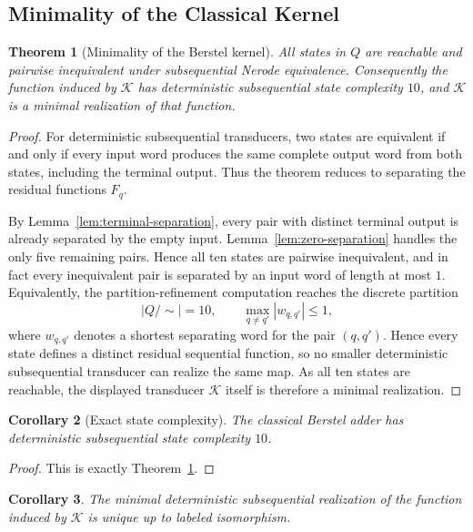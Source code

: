\documentclass[11pt,letterpaper]{article}
\numberwithin{equation}{section}
\theoremstyle{plain}
\newtheorem{theorem}{Theorem}[section]
\newtheorem{corollary}[theorem]{Corollary}
\theoremstyle{definition}
\theoremstyle{remark}
\begin{document}
\subsection{Minimality of the Classical Kernel}

\begin{theorem}[Minimality of the Berstel kernel]\label{thm:berstel-kernel-minimality}
All states in $Q$ are reachable and pairwise inequivalent under subsequential
Nerode equivalence.  Consequently the function induced by $\mathcal K$ has
deterministic subsequential state complexity $10$, and $\mathcal K$ is a
minimal realization of that function.
\end{theorem}

\begin{proof}
For deterministic subsequential transducers, two states are equivalent if and
only if every input word produces the same complete output word from both
states, including the terminal output.  Thus the theorem reduces to separating
the residual functions $F_q$.

By Lemma~\ref{lem:terminal-separation}, every pair with distinct terminal
output is already separated by the empty input.  Lemma~\ref{lem:zero-separation}
handles the only five remaining pairs.  Hence all ten states are pairwise
inequivalent, and in fact every inequivalent pair is separated by an input
word of length at most $1$.  Equivalently, the partition-refinement
computation reaches the discrete partition
\[
\boxed{|Q/\!\sim|=10,\qquad
\max_{q\neq q'}|w_{q,q'}|\le 1,}
\]
where $w_{q,q'}$ denotes a shortest separating word for the pair $(q,q')$.
Hence every state defines a distinct residual sequential function, so no
smaller deterministic subsequential transducer can realize the same map.  As
all ten states are reachable, the displayed transducer $\mathcal K$ itself is
therefore a minimal realization.
\end{proof}

\begin{corollary}[Exact state complexity]\label{cor:berstel-state-complexity}
The classical Berstel adder has deterministic subsequential state complexity
$10$.
\end{corollary}

\begin{proof}
This is exactly Theorem~\ref{thm:berstel-kernel-minimality}.
\end{proof}

\begin{corollary}\label{cor:berstel-kernel-unique}
The minimal deterministic subsequential realization of the function induced by
$\mathcal K$ is unique up to labeled isomorphism.
\end{corollary}
\end{document}
